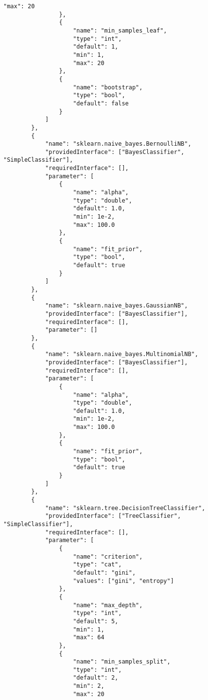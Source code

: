 \begin{Verbatim}[fontsize=\scriptsize]
                    "max": 20
                },
                {
                    "name": "min_samples_leaf",
                    "type": "int",
                    "default": 1,
                    "min": 1,
                    "max": 20
                },
                {
                    "name": "bootstrap",
                    "type": "bool",
                    "default": false
                }
            ]
        },
        {
            "name": "sklearn.naive_bayes.BernoulliNB",
            "providedInterface": ["BayesClassifier", "SimpleClassifier"],
            "requiredInterface": [],
            "parameter": [
                {
                    "name": "alpha",
                    "type": "double",
                    "default": 1.0,
                    "min": 1e-2,
                    "max": 100.0
                },
                {
                    "name": "fit_prior",
                    "type": "bool",
                    "default": true
                }
            ]
        },
        {
            "name": "sklearn.naive_bayes.GaussianNB",
            "providedInterface": ["BayesClassifier"],
            "requiredInterface": [],
            "parameter": []
        },
        {
            "name": "sklearn.naive_bayes.MultinomialNB",
            "providedInterface": ["BayesClassifier"],
            "requiredInterface": [],
            "parameter": [
                {
                    "name": "alpha",
                    "type": "double",
                    "default": 1.0,
                    "min": 1e-2,
                    "max": 100.0
                },
                {
                    "name": "fit_prior",
                    "type": "bool",
                    "default": true
                }
            ]
        },
        {
            "name": "sklearn.tree.DecisionTreeClassifier",
            "providedInterface": ["TreeClassifier", "SimpleClassifier"],
            "requiredInterface": [],
            "parameter": [
                {
                    "name": "criterion",
                    "type": "cat",
                    "default": "gini",
                    "values": ["gini", "entropy"]
                },
                {
                    "name": "max_depth",
                    "type": "int",
                    "default": 5,
                    "min": 1,
                    "max": 64
                },
                {
                    "name": "min_samples_split",
                    "type": "int",
                    "default": 2,
                    "min": 2,
                    "max": 20

\end{Verbatim}
